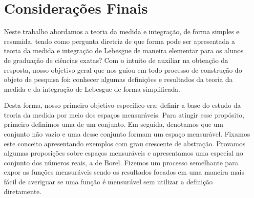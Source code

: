 




\chapter{Considerações Finais}
	Neste trabalho abordamos a teoria da medida e integração, de forma simples e resumida, tendo como pergunta diretriz de que forma pode ser apresentada a teoria da medida e integração de Lebesgue de maneira elementar para os alunos de graduação de ciências exatas?
	Com o intuito de auxiliar na obtenção da resposta, nosso objetivo geral que nos guiou em todo processo de construção do objeto de pesquisa foi: 
	conhecer algumas definições e resultados da teoria da medida e da integração de Lebesgue de forma simplificada.
	
	Desta forma, nosso primeiro objetivo específico era: definir a base do estudo da teoria da medida por meio dos espaços mensuráveis.
	Para atingir esse propósito, primeiro definimos  uma \sigal de um conjunto.
	Em seguida, denotamos que um conjunto não vazio e uma \sigal desse conjunto formam um espaço mensurável.
	Fixamos este conceito apresentando exemplos com grau crescente de abstração.
	Provamos algumas proposições sobre espaços mensuráveis e apresentamos uma \sigal especial no conjunto dos números reais, a \sigal de Borel.
	Fizemos um processo semelhante para expor as funções mensuráveis sendo os resultados focados em uma maneira mais fácil de averiguar se uma função é mensurável sem utilizar a definição diretamente.
	

